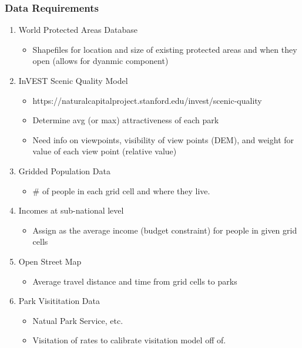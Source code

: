 \documentclass[
  letterpaper,
  DIV=11,
  numbers=noendperiod]{scrartcl}
\providecommand{\tightlist}{%
  \setlength{\itemsep}{0pt}\setlength{\parskip}{0pt}}\usepackage{longtable,booktabs,array}
\begin{document}
\hypertarget{data-requirements-1}{%
\subsubsection{Data Requirements}\label{data-requirements-1}}

\begin{enumerate}
\def\labelenumi{\arabic{enumi}.}
\tightlist
\item
  World Protected Areas Database

  \begin{itemize}
  \tightlist
  \item
    Shapefiles for location and size of existing protected areas and
    when they open (allows for dyanmic component)
  \end{itemize}
\item
  InVEST Scenic Quality Model

  \begin{itemize}
  \tightlist
  \item
    https://naturalcapitalproject.stanford.edu/invest/scenic-quality
  \item
    Determine avg (or max) attractiveness of each park
  \item
    Need info on viewpoints, visibility of view points (DEM), and weight
    for value of each view point (relative value)
  \end{itemize}
\item
  Gridded Population Data

  \begin{itemize}
  \tightlist
  \item
    \# of people in each grid cell and where they live.
  \end{itemize}
\item
  Incomes at sub-national level

  \begin{itemize}
  \tightlist
  \item
    Assign as the average income (budget constraint) for people in given
    grid cells
  \end{itemize}
\item
  Open Street Map

  \begin{itemize}
  \tightlist
  \item
    Average travel distance and time from grid cells to parks
  \end{itemize}
\item
  Park Visititation Data

  \begin{itemize}
  \tightlist
  \item
    Natual Park Service, etc.
  \item
    Visitation of rates to calibrate visitation model off of.
  \end{itemize}
\end{enumerate}
\end{document}

